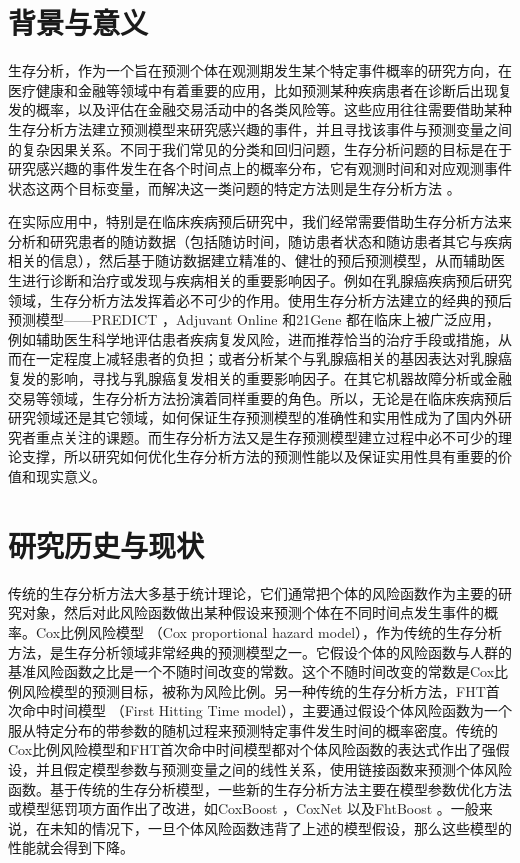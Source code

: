 \thesischapterexordium

\section{背景与意义}

生存分析，作为一个旨在预测个体在观测期发生某个特定事件概率的研究方向，在医疗健康和金融等领域中有着重要的应用，比如预测某种疾病患者在诊断后出现复发的概率，以及评估在金融交易活动中的各类风险等。这些应用往往需要借助某种生存分析方法建立预测模型来研究感兴趣的事件，并且寻找该事件与预测变量之间的复杂因果关系。不同于我们常见的分类和回归问题，生存分析问题的目标是在于研究感兴趣的事件发生在各个时间点上的概率分布，它有观测时间和对应观测事件状态这两个目标变量，而解决这一类问题的特定方法则是生存分析方法 。

在实际应用中，特别是在临床疾病预后研究中，我们经常需要借助生存分析方法来分析和研究患者的随访数据（包括随访时间，随访患者状态和随访患者其它与疾病相关的信息），然后基于随访数据建立精准的、健壮的预后预测模型，从而辅助医生进行诊断和治疗或发现与疾病相关的重要影响因子。例如在乳腺癌疾病预后研究领域，生存分析方法发挥着必不可少的作用。使用生存分析方法建立的经典的预后预测模型——PREDICT ，Adjuvant Online  和21Gene 都在临床上被广泛应用，例如辅助医生科学地评估患者疾病复发风险，进而推荐恰当的治疗手段或措施，从而在一定程度上减轻患者的负担；或者分析某个与乳腺癌相关的基因表达对乳腺癌复发的影响，寻找与乳腺癌复发相关的重要影响因子。在其它机器故障分析或金融交易等领域，生存分析方法扮演着同样重要的角色。所以，无论是在临床疾病预后研究领域还是其它领域，如何保证生存预测模型的准确性和实用性成为了国内外研究者重点关注的课题。而生存分析方法又是生存预测模型建立过程中必不可少的理论支撑，所以研究如何优化生存分析方法的预测性能以及保证实用性具有重要的价值和现实意义。

\section{研究历史与现状}

传统的生存分析方法大多基于统计理论，它们通常把个体的风险函数作为主要的研究对象，然后对此风险函数做出某种假设来预测个体在不同时间点发生事件的概率。Cox比例风险模型 （Cox proportional hazard model），作为传统的生存分析方法，是生存分析领域非常经典的预测模型之一。它假设个体的风险函数与人群的基准风险函数之比是一个不随时间改变的常数。这个不随时间改变的常数是Cox比例风险模型的预测目标，被称为风险比例。另一种传统的生存分析方法，FHT首次命中时间模型 \cite{Lee2006Threshold, Lee2010Threshold}（First Hitting Time model），主要通过假设个体风险函数为一个服从特定分布的带参数的随机过程来预测特定事件发生时间的概率密度。传统的Cox比例风险模型和FHT首次命中时间模型都对个体风险函数的表达式作出了强假设，并且假定模型参数与预测变量之间的线性关系，使用链接函数来预测个体风险函数。基于传统的生存分析模型，一些新的生存分析方法主要在模型参数优化方法或模型惩罚项方面作出了改进，如CoxBoost ，CoxNet 以及FhtBoost 。一般来说，在未知的情况下，一旦个体风险函数违背了上述的模型假设，那么这些模型的性能就会得到下降。

